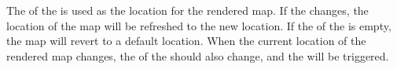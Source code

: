 The  of the  is used as the location for the rendered map. If the  changes, the location of the map will be refreshed to the new location. If the  of the  is empty, the map will revert to a default location. When the current location of the rendered map changes, the  of the  should also change, and the   will be triggered.
